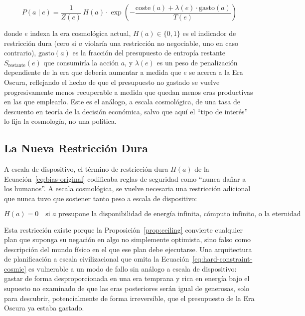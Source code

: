 \documentclass[11pt]{article}
\begin{document}
\begin{equation}
\label{eq:bias-extended}
P(a \mid e) = \frac{1}{Z(e)} \, H(a) \cdot \exp\left(-\frac{\mathrm{coste}(a) + \lambda(e)\cdot \mathrm{gasto}(a) }{T(e)}\right)
\end{equation}

\noindent donde $e$ indexa la era cosmológica actual, $H(a) \in \{0,1\}$ es el indicador de restricción dura (cero si $a$ violaría una restricción no negociable, uno en caso contrario), $\mathrm{gasto}(a)$ es la fracción del presupuesto de entropía restante $S_{\text{restante}}(e)$ que consumiría la acción $a$, y $\lambda(e)$ es un peso de penalización dependiente de la era que debería aumentar a medida que $e$ se acerca a la Era Oscura, reflejando el hecho de que el presupuesto no gastado se vuelve progresivamente menos recuperable a medida que quedan menos eras productivas en las que emplearlo. Este es el análogo, a escala cosmológica, de una tasa de descuento en teoría de la decisión económica, salvo que aquí el ``tipo de interés'' lo fija la cosmología, no una política.

\subsection{La Nueva Restricción Dura}

A escala de dispositivo, el término de restricción dura $H(a)$ de la Ecuación~\ref{eq:bias-original} codificaba reglas de seguridad como ``nunca dañar a los humanos''. A escala cosmológica, se vuelve necesaria una restricción adicional que nunca tuvo que sostener tanto peso a escala de dispositivo:

\begin{equation}
\label{eq:hard-constraint-cosmic}
H(a) = 0 \quad \text{si } a \text{ presupone la disponibilidad de energía infinita, cómputo infinito, o la eternidad literal.}
\end{equation}

\noindent Esta restricción existe porque la Proposición~\ref{prop:ceiling} convierte cualquier plan que suponga su negación en algo no simplemente optimista, sino falso como descripción del mundo físico en el que ese plan debe ejecutarse. Una arquitectura de planificación a escala civilizacional que omita la Ecuación~\ref{eq:hard-constraint-cosmic} es vulnerable a un modo de fallo sin análogo a escala de dispositivo: gastar de forma desproporcionada en una era temprana y rica en energía bajo el supuesto no examinado de que las eras posteriores serán igual de generosas, solo para descubrir, potencialmente de forma irreversible, que el presupuesto de la Era Oscura ya estaba gastado.
\end{document}
